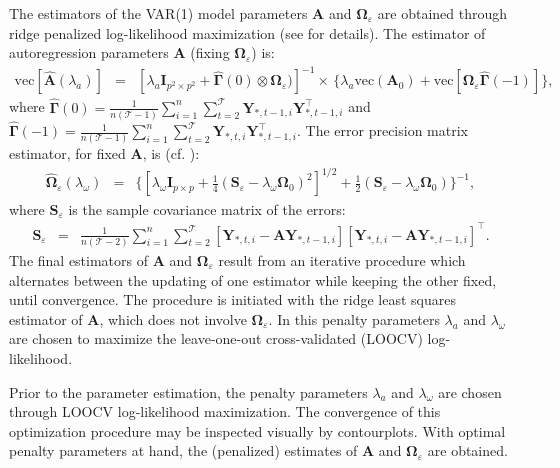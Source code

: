 The estimators of the VAR(1) model parameters $\mathbf{A}$ and $\boldsymbol{\Omega}_{\varepsilon}$ are obtained through ridge penalized log-likelihood maximization (see \cite{Miok2017} for details). The estimator of autoregression parameters $\mathbf{A}$ (fixing $\boldsymbol{\Omega}_{\varepsilon}$) is: 
\begin{eqnarray}\label{ridgeA1}
\mbox{vec}[ \hat{\mathbf{A}}(\lambda_a) ] & = &  [\lambda_a \mathbf{I}_{p^2 \times p^2}  + \hat{\boldsymbol{\Gamma}}(0) \otimes \mathbf{\Omega}_{\varepsilon} \big) ]^{-1} \times \, \{ \lambda_a \mbox{vec}(\mathbf{A}_0) + \mbox{vec} [\mathbf{\Omega}_{\varepsilon} \hat{\boldsymbol{\Gamma}}(-1) ] \},
\end{eqnarray}
where $\hat{\boldsymbol{\Gamma}}(0) = \frac{1}{n(\mathcal{T}-1)} \sum_{i=1}^{n}\sum_{t=2}^{\mathcal{T}} \mathbf{Y}_{*,t-1,i} \mathbf{Y}_{*,t-1,i}^{\top}$ and \\
$\hat{\boldsymbol{\Gamma}}(-1) = \frac{1}{n(\mathcal{T}-1)} \sum_{i=1}^{n} \sum_{t=2}^{\mathcal{T}} \mathbf{Y}_{*,t,i} \mathbf{Y}_{*,t-1,i}^{\top}$. The error precision matrix estimator, for fixed $\mathbf{A}$, is (cf. \cite{Wieringen2016}): 
\begin{eqnarray} \label{ridgePrecision}
\widehat{\mathbf{\Omega}}_{\varepsilon} (\lambda_{\omega}) & = & \{ [ \lambda_{\omega} \mathbf{I}_{p \times p} + \tfrac{1}{4} (\mathbf{S}_{\varepsilon} - \lambda_{\omega} \mathbf{\Omega}_0)^2 ]^{1/2} +
\tfrac{1}{2} (\mathbf{S}_{\varepsilon} - \lambda_{\omega} \mathbf{\Omega}_0) \}^{-1},
\end{eqnarray}
where $\mathbf{S}_{\varepsilon}$ is the sample covariance matrix of the errors:
\begin{eqnarray*}
\mathbf{S}_{\varepsilon} & = & \frac{1}{n(\mathcal{T}-2)}\sum_{i=1}^{n} \sum_{t=2}^{\mathcal{T}} \left[\mathbf{Y}_{*,t,i} - \mathbf{A} \mathbf{Y}_{*,t-1,i} \right] \left[\mathbf{Y}_{*,t,i} - \mathbf{A} \mathbf{Y}_{*,t-1,i} \right]^{\top}.
\end{eqnarray*}
The final estimators of $\mathbf{A}$ and $\boldsymbol{\Omega}_{\varepsilon}$ result from an iterative procedure which alternates between the updating of one estimator while keeping the other fixed, until convergence. The procedure is initiated with the ridge least squares estimator of $\mathbf{A}$, which does not involve $\boldsymbol{\Omega}_{\varepsilon}$. In this penalty parameters $\lambda_a$ and $\lambda_{\omega}$ are chosen to maximize the leave-one-out cross-validated (LOOCV) log-likelihood. 

Prior to the parameter estimation, the penalty parameters $\lambda_a$ and $\lambda_{\omega}$ are chosen through LOOCV log-likelihood maximization. The convergence of this optimization procedure may be inspected visually by contourplots. With optimal penalty parameters at hand, the (penalized) estimates of $\mathbf{A}$ and $\boldsymbol{\Omega}_{\varepsilon}$ are obtained. 

